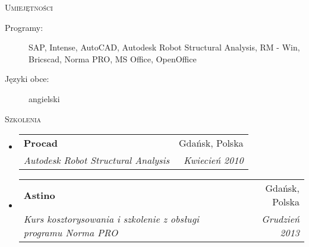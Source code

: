 \documentclass[letterpaper,11pt]{article}
\makeatletter
\newcommand{\resheading}[1]{
  \begin{tcolorbox}
  \textsc{#1}
  \end{tcolorbox}
}
\newcommand{\ressubheading}[4]{
\begin{tabular*}{6.5in}{l@{\extracolsep{\fill}}r}
		\textbf{#1} & #2 \\
		\textit{#3} & \textit{#4} \\
\end{tabular*}\vspace{-6pt}}
\makeatother
\begin{document}
\resheading{Umiejętności}

\begin{description}
 \item[Programy:]
   SAP, Intense, AutoCAD, Autodesk Robot Structural Analysis, RM - Win,\\
   Bricscad, Norma PRO, MS Office, OpenOffice
 \item[Języki obce:]
   angielski
\end{description}

\resheading{Szkolenia}

\begin{itemize}
\item
  \ressubheading{Procad}{Gdańsk, Polska}{Autodesk Robot Structural Analysis}{Kwiecień 2010}
\item
  \ressubheading{Astino}{Gdańsk, Polska}{Kurs kosztorysowania i szkolenie z obsługi programu Norma PRO}{Grudzień 2013}
\end{itemize}
\end{document}
